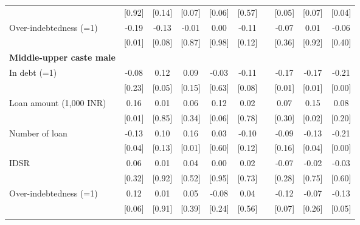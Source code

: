 \begin{table}[htbp]
{\begin{tabular}{rccccccccc}
          & [0.92] & [0.14] & [0.07] & [0.06] & [0.57] &       & [0.05] & [0.07] & [0.04] \\
    \multicolumn{1}{l}{Over-indebtedness (=1)} & \cellcolor{yellow}-0.19 & \cellcolor{yellow}-0.13 & -0.01 & 0.00  & -0.11 &       & -0.07 & 0.01  & -0.06 \\
          & [0.01] & [0.08] & [0.87] & [0.98] & [0.12] &       & [0.36] & [0.92] & [0.40] \\
    \midrule
    \multicolumn{1}{l}{\textbf{Middle-upper caste male}} &       &       &       &       &       &       &       &       &  \\
    \multicolumn{1}{l}{In debt (=1)} & -0.08 & \cellcolor{yellow}0.12 & 0.09  & -0.03 & \cellcolor{yellow}-0.11 &       & \cellcolor{yellow}-0.17 & \cellcolor{yellow}-0.17 & \cellcolor{yellow}-0.21 \\
          & [0.23] & [0.05] & [0.15] & [0.63] & [0.08] &       & [0.01] & [0.01] & [0.00] \\
    \multicolumn{1}{l}{Loan amount (1,000 INR)} & \cellcolor{yellow}0.16 & 0.01  & 0.06  & \cellcolor{yellow}0.12 & 0.02  &       & 0.07  & \cellcolor{yellow}0.15 & 0.08 \\
          & [0.01] & [0.85] & [0.34] & [0.06] & [0.78] &       & [0.30] & [0.02] & [0.20] \\
    \multicolumn{1}{l}{Number of loan } & \cellcolor{yellow}-0.13 & 0.10  & \cellcolor{yellow}0.16 & 0.03  & -0.10 &       & -0.09 & \cellcolor{yellow}-0.13 & \cellcolor{yellow}-0.21 \\
          & [0.04] & [0.13] & [0.01] & [0.60] & [0.12] &       & [0.16] & [0.04] & [0.00] \\
    \multicolumn{1}{l}{IDSR} & 0.06  & 0.01  & 0.04  & 0.00  & 0.02  &       & -0.07 & -0.02 & -0.03 \\
          & [0.32] & [0.92] & [0.52] & [0.95] & [0.73] &       & [0.28] & [0.75] & [0.60] \\
    \multicolumn{1}{l}{Over-indebtedness (=1)} & \cellcolor{yellow}0.12 & 0.01  & 0.05  & -0.08 & 0.04  &       & \cellcolor{yellow}-0.12 & -0.07 & \cellcolor{yellow}-0.13 \\
          & [0.06] & [0.91] & [0.39] & [0.24] & [0.56] &       & [0.07] & [0.26] & [0.05] \\
    \bottomrule
	\Tablenote{10}{p-value between [hooks].} \\			
    \end{tabular}%
	}
  \label{tab:descXY}%
\end{table}%
